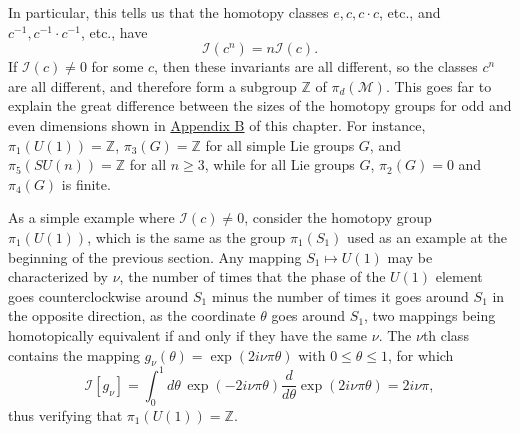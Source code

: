 In particular, this tells us that the homotopy classes
$e,c,c\cdot c$, etc., and $c^{-1},c^{-1}\cdot c^{-1}$, etc., have
\begin{equation}
\mathcal I(c^n)=n\mathcal I(c).
\tag{23.4.3}\label{eq:23.4.3}
\end{equation}
If $\mathcal I(c)\ne0$ for some $c$, then these invariants are all
different, so the classes $c^n$ are all different, and therefore form a
subgroup $\mathbb{Z}$ of $\pi_d(\mathcal M)$. This goes far to explain the great
difference between the sizes of the homotopy groups for odd and even
dimensions shown in \hyperref[app:23.B]{Appendix B} of this chapter. For instance,
$\pi_1(U(1))=\mathbb{Z}$, $\pi_3(G)=\mathbb{Z}$ for all simple Lie groups $G$, and
$\pi_5(SU(n))=\mathbb{Z}$ for all $n\geq3$, while for all Lie groups $G$,
$\pi_2(G)=0$ and $\pi_4(G)$ is finite.

As a simple example where $\mathcal I(c)\ne0$, consider the homotopy
group $\pi_1(U(1))$, which is the same as the group $\pi_1(S_1)$ used as
an example at the beginning of the previous section. Any mapping
$S_1\mapsto U(1)$ may be characterized by $\nu$, the number of times that
the phase of the $U(1)$ element goes counterclockwise around $S_1$ minus
the number of times it goes around $S_1$ in the opposite direction, as
the coordinate $\theta$ goes around $S_1$, two mappings being
homotopically equivalent if and only if they have the same $\nu$. The
$\nu$th class contains the mapping
$g_\nu(\theta)=\exp(2i\nu\pi\theta)$ with $0\leq\theta\leq1$, for which
\[
\mathcal I[g_\nu]
=\int_0^1d\theta\,\exp(-2i\nu\pi\theta)
\frac{d}{d\theta}\exp(2i\nu\pi\theta)
=2i\nu\pi,
\]
thus verifying that $\pi_1(U(1))=\mathbb{Z}$.

